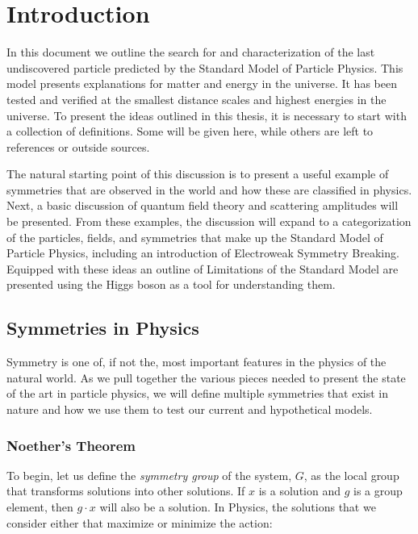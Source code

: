 \chapter{Introduction}
\label{sec:intro}

In this document we outline the search for and characterization of the last undiscovered particle predicted by the Standard Model of Particle Physics. This model presents explanations for matter and energy in the universe. It has been tested and verified at the smallest distance scales and highest energies in the universe. To present the ideas outlined in this thesis, it is necessary to start with a collection of definitions. Some will be given here, while others are left to references or outside sources. 


The natural starting point of this discussion is to present a useful example of symmetries that are observed in the world and how these are classified in physics. Next, a basic discussion of quantum field theory and scattering amplitudes will be presented. From these examples, the discussion will expand to a categorization of the particles, fields, and symmetries that make up the Standard Model of Particle Physics, including an introduction of Electroweak Symmetry Breaking. Equipped with these ideas an outline of Limitations of the Standard Model are presented using the Higgs boson as a tool for understanding them.

\section{Symmetries in Physics}
\label{sec:Symmetries}

Symmetry is one of, if not the, most important features in the physics of the natural world. As we pull together the various pieces needed to present the state of the art in particle physics, we will define multiple symmetries that exist in nature and how we use them to test our current and hypothetical models.

\subsection{Noether's Theorem}
\label{sec:Noether}

To begin, let us define the \textit{symmetry group} of the system, $G$, as the local group that transforms solutions into other solutions. If $x$ is a solution and $g$ is a group element, then $ g \cdot x$ will also be a solution. In Physics, the solutions that we consider either that maximize or minimize the action:  

